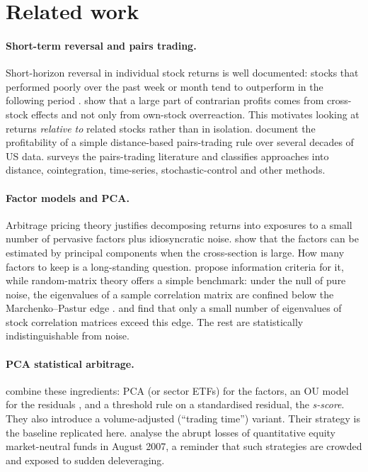 \section{Related work}
\label{sec:related}

\paragraph{Short-term reversal and pairs trading.}
Short-horizon reversal in individual stock returns is well documented: stocks that performed
poorly over the past week or month tend to outperform in the following period
\citep{lehmann1990,lo1990}. \citet{lo1990} show that a large part of contrarian profits comes
from cross-stock effects and not only from own-stock overreaction. This motivates looking at
returns \emph{relative to} related stocks rather than in isolation. \citet{gatev2006} document
the profitability of a simple distance-based pairs-trading rule over several decades of US data.
\citet{krauss2017} surveys the pairs-trading literature and classifies approaches into distance,
cointegration, time-series, stochastic-control and other methods.

\paragraph{Factor models and PCA.}
Arbitrage pricing theory \citep{ross1976} justifies decomposing returns into exposures to a
small number of pervasive factors plus idiosyncratic noise. \citet{connor1986} show that the
factors can be estimated by principal components when the cross-section is large. How many
factors to keep is a long-standing question. \citet{bai2002} propose information criteria for
it, while random-matrix theory offers a simple benchmark: under the null of pure noise, the
eigenvalues of a sample correlation matrix are confined below the Marchenko--Pastur edge
\citep{marchenko1967}. \citet{laloux1999} and \citet{plerou2002} find that only a small number of
eigenvalues of stock correlation matrices exceed this edge. The rest are statistically
indistinguishable from noise.

\paragraph{PCA statistical arbitrage.}
\citet{avellaneda2010} combine these ingredients: PCA (or sector ETFs) for the factors, an OU
model for the residuals \citep{uhlenbeck1930}, and a threshold rule on a standardised residual,
the \emph{s-score}. They also introduce a volume-adjusted (``trading time'') variant. Their
strategy is the baseline replicated here. \citet{khandani2007} analyse the abrupt losses of
quantitative equity market-neutral funds in August 2007, a reminder that such strategies are
crowded and exposed to sudden deleveraging.

